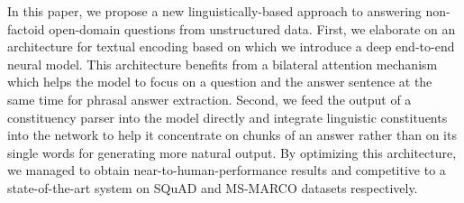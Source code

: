 In this paper, we propose a new linguistically-based approach to answering non-factoid open-domain questions from unstructured data. First, we elaborate on an architecture for textual encoding based on which we introduce a deep end-to-end neural model. This architecture benefits from a bilateral attention mechanism which helps the model to focus on a question and the answer sentence at the same time for phrasal answer extraction. Second, we feed the output of a constituency parser into the model directly and integrate linguistic constituents into the network to help it concentrate on chunks of an answer rather than on its single words for generating more natural output. By optimizing this architecture, we managed to obtain near-to-human-performance results and competitive to a state-of-the-art system on SQuAD and MS-MARCO datasets respectively.
